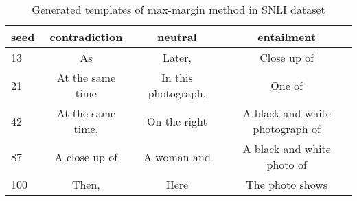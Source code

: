 
\begin{table*}[!h]
	\centering
	\small
	\begin{tabular}{l|ccc}
		\toprule
		\textbf{seed} & \textbf{contradiction} & \textbf{neutral} & \textbf{entailment}\\
		\midrule
		13  & As &  Later, & Close up of \\
		21   & At the same time  &  In this photograph, & One of \\
		42   & At the same time, & On the right & A black and white photograph of \\
		87   & A close up of  & A woman and & A black and white photo of \\
		100   & Then, &   Here & The photo shows \\
		\bottomrule
	\end{tabular}
	\caption{Generated templates of max-margin method in SNLI dataset}
	\label{table:template2}
\end{table*}




